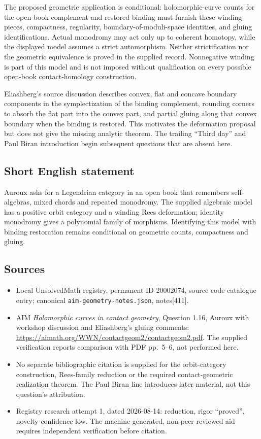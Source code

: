 \documentclass[11pt]{article}
\begin{document}
The proposed geometric application is conditional: holomorphic-curve counts for the open-book complement and restored binding must furnish these winding pieces, compactness, regularity, boundary-of-moduli-space identities, and gluing identifications. Actual monodromy may act only up to coherent homotopy, while the displayed model assumes a strict automorphism. Neither strictification nor the geometric equivalence is proved in the supplied record. Nonnegative winding is part of this model and is not imposed without qualification on every possible open-book contact-homology construction.

Eliashberg's source discussion describes convex, flat and concave boundary components in the symplectization of the binding complement, rounding corners to absorb the flat part into the convex part, and partial gluing along that convex boundary when the binding is restored. This motivates the deformation proposal but does not give the missing analytic theorem. The trailing ``Third day'' and Paul Biran introduction begin subsequent questions that are absent here.
\subsection{Short English statement}
Auroux asks for a Legendrian category in an open book that remembers self-algebras, mixed chords and repeated monodromy. The supplied algebraic model has a positive orbit category and a winding Rees deformation; identity monodromy gives a polynomial family of morphisms. Identifying this model with binding restoration remains conditional on geometric counts, compactness and gluing.
\subsection{Sources}
\begin{itemize}
\item Local UnsolvedMath registry, permanent ID 20002074, source code catalogue entry; canonical \texttt{aim-geometry-notes.json}, notes[411].
\item AIM \emph{Holomorphic curves in contact geometry}, Question 1.16, Auroux with workshop discussion and Eliashberg's gluing comments: \url{https://aimath.org/WWN/contactgeom2/contactgeom2.pdf}. The supplied verification reports comparison with PDF pp.~5--6, not performed here.
\item No separate bibliographic citation is supplied for the orbit-category construction, Rees-family reduction or the required contact-geometric realization theorem. The Paul Biran line introduces later material, not this question's attribution.
\item Registry research attempt 1, dated 2026-08-14: reduction, rigor ``proved'', novelty confidence low. The machine-generated, non-peer-reviewed aid requires independent verification before citation.
\end{itemize}
\end{document}
